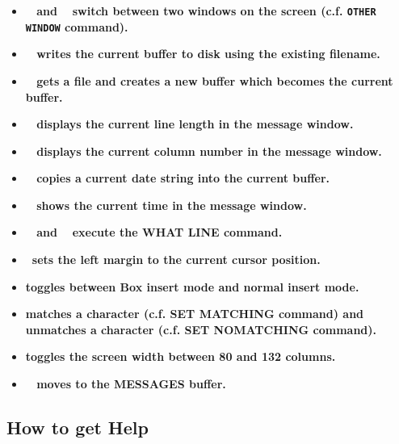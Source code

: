 \begin{itemize}
\item {\bf \gold\ \keyname{$\bigtriangleup$} and \gold\ 
       \keyname{$\bigtriangledown$} switch
       between two windows on the screen (c.f. {\tt OTHER WINDOW} command).}

\item {\bf \gold\  writes the current buffer to disk using the 
       existing filename.}

\item {\bf \gold\  gets a file and creates a new buffer which 
       becomes the current buffer.}

\item {\bf \gold\  displays the current line length in the message 
       window.}

\item {\bf \gold\  displays the current column number in the 
       message window.}

\item {\bf \gold\  copies a current date string into the current 
       buffer.}

\item {\bf \gold\  shows the current time in the message window.}

\item {\bf \gold\ \keyname{/} and \gold\  execute the WHAT LINE
      command.}

\item {\bf {}  \ sets the left margin to the current
      cursor position.}

\item {\bf {} toggles between Box insert mode and normal insert 
       mode.}

\item {\bf {} matches a character (c.f. SET MATCHING command) and 
       \gold\ \keyname{F18} unmatches a character (c.f. SET NOMATCHING
       command).}

\item {\bf {} toggles the screen width between 80 and 132 columns.}

\item {\bf \gold\  moves to the MESSAGES buffer.}

\end{itemize}

\subsection{How to get Help}
\label{getting_help}

